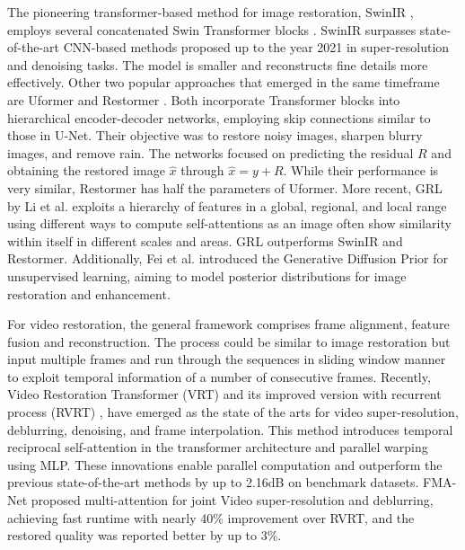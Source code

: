\documentclass[11pt,a4paper]{article}
\begin{document}
The pioneering transformer-based method for image restoration, SwinIR \cite{Liang:SwinIR:2021}, employs several concatenated Swin Transformer blocks \cite{Liu:Swin:2021}. SwinIR surpasses state-of-the-art CNN-based methods proposed up to the year 2021 in super-resolution and denoising tasks. The model is smaller and reconstructs fine details more effectively.
Other two popular approaches that emerged in the same timeframe are Uformer \cite{Wang:Uformer:2022} and Restormer \cite{Zamir:Restormer:2022}. Both incorporate Transformer blocks into hierarchical encoder-decoder networks, employing skip connections similar to those in U-Net. Their objective was to restore noisy images, sharpen blurry images, and remove rain. The networks focused on predicting the residual $R$ and obtaining the restored image $\hat{x}$ through $\hat{x} = y + R$. While their performance is very similar, Restormer has half the parameters of Uformer. More recent, GRL by Li et al. \cite{li:GRL:2023} exploits a hierarchy of features in a global, regional, and local range using different ways to compute self-attentions as an image often show similarity within itself in different scales and areas. GRL outperforms SwinIR and Restormer. Additionally, Fei et al. introduced the Generative Diffusion Prior \cite{Fei:Generative:2023} for unsupervised learning, aiming to model posterior distributions for image restoration and enhancement.

For video restoration, the general framework comprises frame alignment, feature fusion and reconstruction. The process could be similar to image restoration but input multiple frames and run through the sequences in sliding window manner to exploit temporal information of a number of consecutive frames. 
Recently, Video Restoration Transformer (VRT) \cite{Liang:VRT:2024} and its improved version with recurrent process (RVRT) \cite{liang:RVRT:2022}, have emerged as the state of the arts for video super-resolution, deblurring, denoising, and frame interpolation. This method introduces temporal reciprocal self-attention in the transformer architecture and parallel warping using MLP. These innovations enable parallel computation and outperform the previous state-of-the-art methods by up to 2.16dB on benchmark datasets. FMA-Net \cite{Youk:FMA:2024} proposed multi-attention for joint Video super-resolution and deblurring, achieving fast runtime with nearly 40\% improvement over RVRT, and the restored quality was reported better by up to 3\%. 
\end{document}
